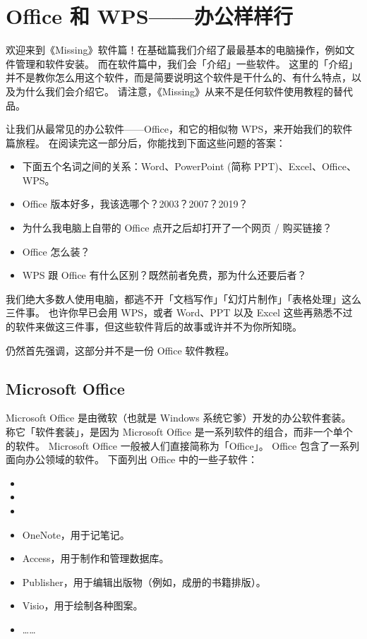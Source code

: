 \chapter{Office 和 WPS——办公样样行}
\label{office-and-wps}

\begin{note}
  欢迎来到《Missing》软件篇！在基础篇我们介绍了最最基本的电脑操作，例如文件管理和软件安装。
  而在软件篇中，我们会「介绍」一些软件。
  这里的「介绍」并不是教你怎么用这个软件，而是简要说明这个软件是干什么的、有什么特点，以及为什么我们会介绍它。
  请注意，《Missing》从来不是任何软件使用教程的替代品。
\end{note}

\begin{intro}
  让我们从最常见的办公软件——Office，和它的相似物 WPS，来开始我们的软件篇旅程。
  在阅读完这一部分后，你能找到下面这些问题的答案：
  \begin{itemize}
    \item 下面五个名词之间的关系：Word、PowerPoint (简称 PPT)、Excel、Office、WPS。
    \item Office 版本好多，我该选哪个？2003？2007？2019？
    \item 为什么我电脑上自带的 Office 点开之后却打开了一个网页 / 购买链接？
    \item Office 怎么装？
    \item WPS 跟 Office 有什么区别？既然前者免费，那为什么还要后者？
  \end{itemize}
\end{intro}

我们绝大多数人使用电脑，都逃不开「文档写作」「幻灯片制作」「表格处理」这么三件事。
也许你早已会用 WPS，或者 Word、PPT 以及 Excel 这些再熟悉不过的软件来做这三件事，但这些软件背后的故事或许并不为你所知晓。

仍然首先强调，这部分并不是一份 Office 软件教程。

\section{Microsoft Office}

Microsoft Office 是由微软（也就是 Windows 系统它爹）开发的办公软件套装。
称它「软件套装」，是因为 Microsoft Office 是一系列软件的组合，而非一个单个的软件。
Microsoft Office 一般被人们直接简称为「Office」。
Office 包含了一系列面向办公领域的软件。
下面列出 Office 中的一些子软件：

\begin{itemize}
  \item {}
  \item {}
  \item {}
  \item OneNote，用于记笔记。
  \item Access，用于制作和管理数据库。
  \item Publisher，用于编辑出版物（例如，成册的书籍排版）。
  \item Visio，用于绘制各种图案。
  \item ……
\end{itemize}

